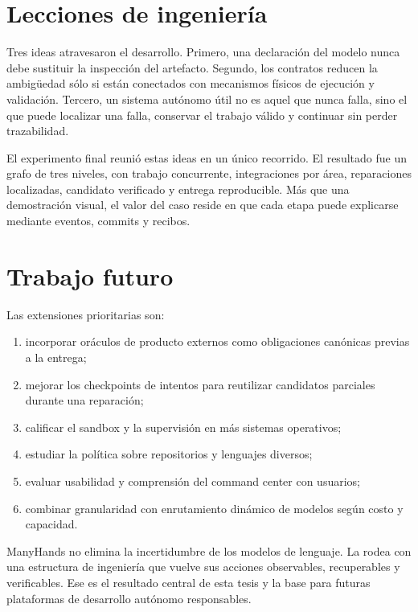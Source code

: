 \section{Lecciones de ingeniería}

Tres ideas atravesaron el desarrollo. Primero, una declaración del modelo nunca
debe sustituir la inspección del artefacto. Segundo, los contratos reducen la
ambigüedad sólo si están conectados con mecanismos físicos de ejecución y
validación. Tercero, un sistema autónomo útil no es aquel que nunca falla, sino
el que puede localizar una falla, conservar el trabajo válido y continuar sin
perder trazabilidad.

El experimento final reunió estas ideas en un único recorrido. El resultado fue
un grafo de tres niveles, con trabajo concurrente, integraciones por área,
reparaciones localizadas, candidato verificado y entrega reproducible. Más que
una demostración visual, el valor del caso reside en que cada etapa puede
explicarse mediante eventos, commits y recibos.

\section{Trabajo futuro}

Las extensiones prioritarias son:

\begin{enumerate}
  \item incorporar oráculos de producto externos como obligaciones canónicas
  previas a la entrega;
  \item mejorar los checkpoints de intentos para reutilizar candidatos parciales
  durante una reparación;
  \item calificar el sandbox y la supervisión en más sistemas operativos;
  \item estudiar la política sobre repositorios y lenguajes diversos;
  \item evaluar usabilidad y comprensión del command center con usuarios;
  \item combinar granularidad con enrutamiento dinámico de modelos según costo y
  capacidad.
\end{enumerate}

ManyHands no elimina la incertidumbre de los modelos de lenguaje. La rodea con
una estructura de ingeniería que vuelve sus acciones observables, recuperables
y verificables. Ese es el resultado central de esta tesis y la base para futuras
plataformas de desarrollo autónomo responsables.

